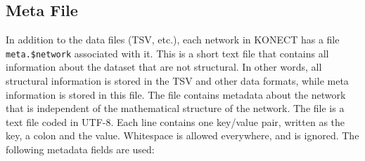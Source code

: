 \documentclass{article}
\begin{document}
\subsection{Meta File}
In addition to the data files (TSV, etc.), each network in KONECT has a
file \texttt{meta.\$network} associated with it.  This is a short text
file that contains all information about the dataset that are not
structural.  In other words, all structural information is stored in the
TSV and other data formats, while meta information is stored in this
file. 
The file contains metadata about the
network that is independent of the mathematical structure of the
network.  
The file is a text file coded in UTF-8.  Each line
contains one key/value pair, written as the key, a colon and the
value.  Whitespace is allowed everywhere, and is ignored.  The following metadata fields are used:
\end{document}
